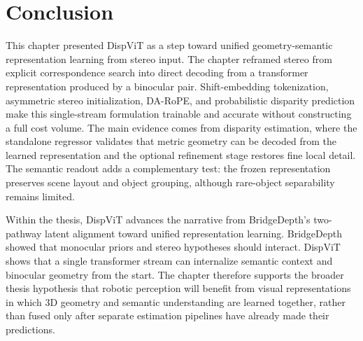 \section{Conclusion}
\label{sec:dispvit_conclusion}
This chapter presented DispViT as a step toward unified geometry-semantic representation learning from stereo input.
The chapter reframed stereo from explicit correspondence search into direct decoding from a transformer representation produced by a binocular pair.
Shift-embedding tokenization, asymmetric stereo initialization, DA-RoPE, and probabilistic disparity prediction make this single-stream formulation trainable and accurate without constructing a full cost volume.
The main evidence comes from disparity estimation, where the standalone regressor validates that metric geometry can be decoded from the learned representation and the optional refinement stage restores fine local detail.
The semantic readout adds a complementary test: the frozen representation preserves scene layout and object grouping, although rare-object separability remains limited.

Within the thesis, DispViT advances the narrative from BridgeDepth's two-pathway latent alignment toward unified representation learning.
BridgeDepth showed that monocular priors and stereo hypotheses should interact.
DispViT shows that a single transformer stream can internalize semantic context and binocular geometry from the start.
The chapter therefore supports the broader thesis hypothesis that robotic perception will benefit from visual representations in which 3D geometry and semantic understanding are learned together, rather than fused only after separate estimation pipelines have already made their predictions.
